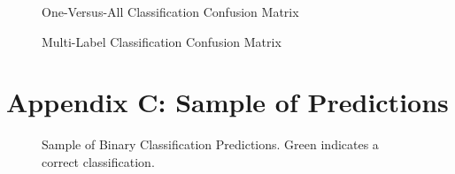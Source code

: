 \documentclass[]{article}
\begin{document}
\begin{figure}[h!]
	\centering
	\caption{One-Versus-All Classification Confusion Matrix}
\end{figure}

\begin{figure}[h!]
	\centering
	\caption{Multi-Label Classification Confusion Matrix}
\end{figure}
\clearpage

\newpage
\section{Appendix C: Sample of Predictions}

\begin{figure}[h!]
	\centering
	\caption{Sample of Binary Classification Predictions. Green indicates a correct classification.}
\end{figure}
\end{document}

